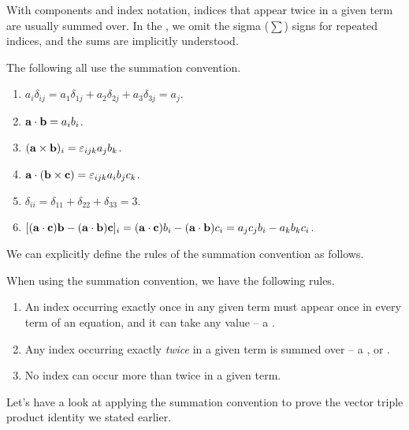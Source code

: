 \documentclass[a4paper]{scrartcl}
\begin{document}
With components and index notation, indices that appear twice in a given term are usually summed over. In the , we omit the sigma ($\sum$) signs for repeated indices, and the sums are implicitly understood.

\begin{example}
    The following all use the summation convention.
    \begin{enumerate}[label=(\roman*)]
        \item $a_i \delta_{ij} = a_1 \delta_{1j} + a_2 \delta_{2j} + a_3\delta_{3j} = a_j$.
        \item $\mathbf{a} \cdot \mathbf{b} = a_i b_i$.
        \item $(\mathbf{a} \times \mathbf{b})_i= \varepsilon_{ijk}a_j b_k$.
        \item $\mathbf{a} \cdot (\mathbf{b} \times \mathbf{c}) = \varepsilon_{ijk} a_i b_j c_k$.
        \item $\delta_{ii} = \delta_{11} + \delta_{22} + \delta_{33} = 3$.
        \item $[(\mathbf{a} \cdot \mathbf{c})\mathbf{b} - (\mathbf{a} \cdot \mathbf{b})\mathbf{c}]_i = (\mathbf{a} \cdot \mathbf{c})b_i - (\mathbf{a} \cdot \mathbf{b})c_i = a_j c_j b_i - a_k b_k c_i$.
    \end{enumerate}
\end{example}

We can explicitly define the rules of the summation convention as follows.

\begin{definition}
    When using the summation convention, we have the following rules.
    \begin{enumerate}[label=(\roman*)]
        \item An index occurring exactly once in any given term must appear once in every term of an equation, and it can take any value -- a .
        \item Any index occurring exactly \emph{twice} in a given term is summed over -- a ,  or .
        \item No index can occur more than twice in a given term.
    \end{enumerate}
\end{definition}

Let's have a look at applying the summation convention to prove the vector triple product identity we stated earlier.
\end{document}
